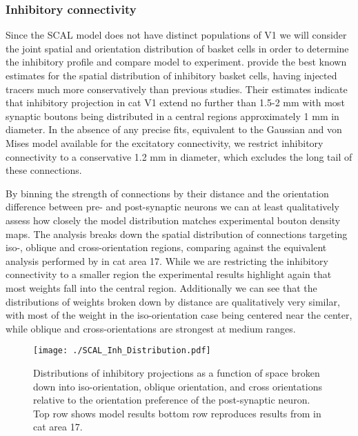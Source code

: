 \subsubsection{Inhibitory connectivity}

Since the SCAL model does not have distinct populations of V1 we will
consider the joint spatial and orientation distribution of basket
cells in order to determine the inhibitory profile and compare model
to experiment. \cite{Kisvarday1997a} provide the best known estimates
for the spatial distribution of inhibitory basket cells, having
injected tracers much more conservatively than previous studies. Their
estimates indicate that inhibitory projection in cat V1 extend no
further than 1.5-2 mm with most synaptic boutons being distributed in
a central regions approximately 1 mm in diameter. In the absence of
any precise fits, equivalent to the Gaussian and von Mises model
available for the excitatory connectivity, we restrict inhibitory
connectivity to a conservative 1.2 mm in diameter, which excludes the
long tail of these connections.

By binning the strength of connections by their distance and the
orientation difference between pre- and post-synaptic neurons we can
at least qualitatively assess how closely the model distribution
matches experimental bouton density maps. The analysis breaks down the
spatial distribution of connections targeting iso-, oblique and
cross-orientation regions, comparing against the equivalent analysis
performed by \cite{Kisvarday1997a} in cat area 17. While we are
restricting the inhibitory connectivity to a smaller region the
experimental results highlight again that most weights fall into the
central region. Additionally we can see that the distributions of
weights broken down by distance are qualitatively very similar, with
most of the weight in the iso-orientation case being centered near the
center, while oblique and cross-orientations are strongest at medium
ranges.

\begin{figure}
	\centering
        \texttt{[image: ./SCAL\_Inh\_Distribution.pdf]}
	\caption[Spatial and orientation distribution of the lateral
      inhibitory weights in SCAL.]{Distributions of inhibitory
      projections as a function of space broken down into
      iso-orientation, oblique orientation, and cross orientations
      relative to the orientation preference of the post-synaptic
      neuron. Top row shows model results bottom row reproduces
      results from \cite{Kisvarday1997a} in cat area 17.}
	\label{LatORDist}
\end{figure}

